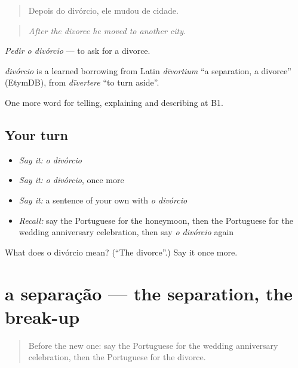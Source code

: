 \begin{quote}
Depois do divórcio, ele mudou de cidade.
\end{quote}

\begin{quote}
\emph{After the divorce he moved to another city.}
\end{quote}

\emph{Pedir o divórcio} — to ask for a divorce.

\begin{cousinweb}
\emph{divórcio} is a learned borrowing from Latin \emph{dīvortium} \textquotedblleft{}a separation, a divorce\textquotedblright{} (EtymDB), from \emph{dīvertere} \textquotedblleft{}to turn aside\textquotedblright{}.
\end{cousinweb}

\begin{grammarlens}[title={What you've built}]
One more word for telling, explaining and describing at B1.
\end{grammarlens}

\subsection*{Your turn}
\begin{itemize}
\raggedright
  \item \emph{Say it:} \emph{o divórcio}
  \item \emph{Say it:} \emph{o divórcio}, once more
  \item \emph{Say it:} a sentence of your own with \emph{o divórcio}
  \item \emph{Recall:} say the Portuguese for the honeymoon, then the Portuguese for the wedding anniversary celebration, then say \emph{o divórcio} again
\end{itemize}

\begin{tcolorbox}[breakable,colback=teal!4,colframe=teal!35!black,title={Before you move on}]
What does o divórcio mean? (\textquotedblleft{}The divorce\textquotedblright{}.) Say it once more.
\end{tcolorbox}
\section[a separação]{a separação — the separation, the break-up}

\label{lesson:PT-C313-separacao}



\begin{quote}
Before the new one: say the Portuguese for the wedding anniversary celebration, then the Portuguese for the divorce.
\end{quote}

